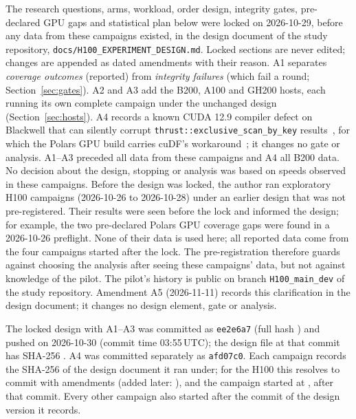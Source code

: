 \documentclass[sigconf, nonacm]{acmart}
\begin{document}
The research questions, arms, workload, order design, integrity gates,
pre-declared GPU gaps and statistical plan below were locked on 2026-10-29,
before any data from these campaigns existed, in the design document of the study
repository, \texttt{docs/H100\_EXPERIMENT\_DESIGN.md}. Locked sections are never edited; changes are
appended as dated amendments with their reason. A1 separates \emph{coverage
outcomes} (reported) from \emph{integrity failures} (which fail a round;
Section~\ref{sec:gates}). A2 and A3 add the B200, A100 and GH200 hosts, each
running its own complete campaign under the unchanged design
(Section~\ref{sec:hosts}). A4 records a known CUDA 12.9 compiler defect on
Blackwell that can silently corrupt \texttt{thrust::exclusive\_scan\_by\_key}
results~\citep{cccl11167}, for which the Polars GPU build carries cuDF's
workaround~\citep{cudf23973}; it changes no gate or analysis. A1--A3 preceded
all data from these campaigns and A4 all B200 data. No decision about the
design, stopping or analysis was based on speeds observed in these campaigns.
Before the design was locked, the author ran exploratory H100 campaigns
(2026-10-26 to 2026-10-28) under an earlier design that was not
pre-registered. Their results were seen before the lock and informed the
design; for example, the two pre-declared Polars GPU coverage gaps were found
in a 2026-10-26 preflight. None of their data is used here; all reported data
come from the four campaigns started after the lock. The pre-registration
therefore guards against choosing the analysis after seeing these campaigns'
data, but not against knowledge of the pilot. The pilot's history is public on
branch \texttt{H100\_main\_dev} of the study repository. Amendment A5 (2026-11-11) records this
clarification in the design document; it changes no design element, gate or
analysis.

The locked design with A1--A3 was committed as \texttt{ee2e6a7} (full hash
\texttt{}) and pushed on
2026-10-30 (commit time 03:55\,UTC); the design file at that commit has SHA-256
\texttt{}.
A4 was committed separately as \texttt{afd07c0}. Each campaign records the
SHA-256 of the design document it ran under; for the H100 this resolves to
commit \texttt{} with 
amendments (added later: ), and the campaign
started at , after that commit. Every other
campaign also started after the commit of the design version it records.
\end{document}
